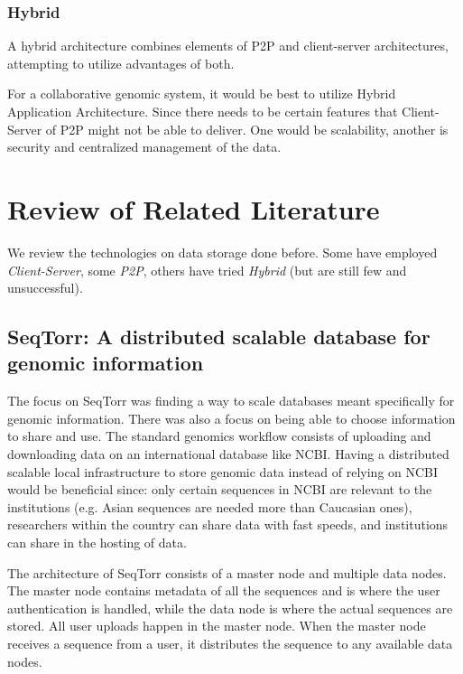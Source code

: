 \documentclass{article}
\begin{document}
\subsubsection{Hybrid}
A hybrid architecture combines elements of P2P and client-server architectures, attempting to utilize advantages of both.

For a collaborative genomic system, it would be best to utilize Hybrid Application Architecture. Since there needs to be certain features that Client-Server of P2P might not be able to deliver. One would be scalability, another is security and centralized management of the data.


\section{Review of Related Literature}

We review the technologies on data storage done before. Some have employed \textit{Client-Server}, some \textit{P2P}, others have tried \textit{Hybrid} (but are still few and unsuccessful).

\subsection{SeqTorr: A distributed scalable database for genomic information}
The focus on SeqTorr was finding a way to scale databases meant specifically for genomic information. There was also a focus on being able to choose information to share and use. The standard genomics workflow consists of uploading and downloading data on an international database like NCBI. Having a distributed scalable local infrastructure to store genomic data instead of relying on NCBI would be beneficial since: only certain sequences in NCBI are relevant to the institutions (e.g. Asian sequences are needed more than Caucasian ones), researchers within the country can share data with fast speeds, and  institutions can share in the hosting of data.

The architecture of SeqTorr consists of a master node and multiple data nodes. The master node contains metadata of all the sequences and is where the user authentication is handled, while the data node is where the actual sequences are stored. All user uploads happen in the master node. When the master node receives a sequence from a user, it distributes the sequence to any available data nodes. 
\autocite{seqtorr}
\end{document}

